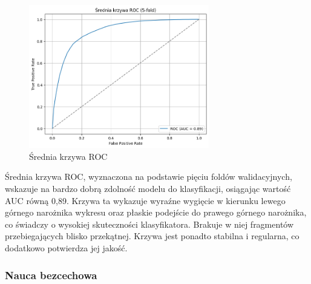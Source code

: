 \documentclass[a4paper,twoside,12pt]{book}
\begin{document}
\begin{figure}[!h]
	\centering
	\includegraphics[width=0.7\textwidth]{img/roc_kfold_feature.png}
	\caption{Średnia krzywa ROC}
	\label{fig:etykieta-rysunku}
\end{figure}
Średnia krzywa ROC, wyznaczona na podstawie pięciu foldów walidacyjnych, wskazuje na bardzo dobrą zdolność modelu do klasyfikacji, osiągając wartość AUC równą 0,89. Krzywa ta wykazuje wyraźne wygięcie w kierunku lewego górnego narożnika wykresu oraz płaskie podejście do prawego górnego narożnika, co świadczy o wysokiej skuteczności klasyfikatora. Brakuje w niej fragmentów przebiegających blisko przekątnej. Krzywa jest ponadto stabilna i regularna, co dodatkowo potwierdza jej jakość.

\newpage
\subsubsection*{Nauca bezcechowa}

\begin{table}[!h]
	\centering
	\caption{Wartości miar jakościowych dla nauki bezcechowej dla walidacji Kfold}
	\label{kfold_bezcechowa}
\end{table}
\end{document}
